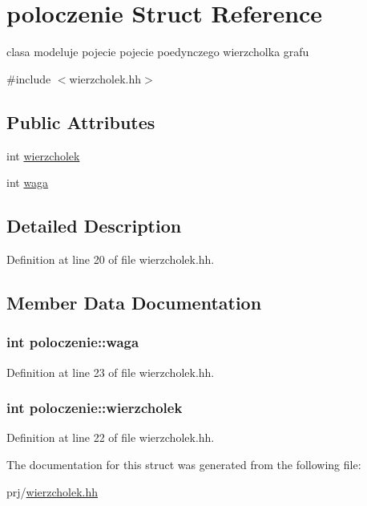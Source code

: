 \hypertarget{structpoloczenie}{\section{poloczenie \-Struct \-Reference}
\label{structpoloczenie}
}


clasa modeluje pojecie pojecie poedynczego wierzcholka grafu  




{\ttfamily \#include $<$wierzcholek.\-hh$>$}

\subsection*{\-Public \-Attributes}
\begin{DoxyCompactItemize}
\item 
int \hyperlink{structpoloczenie_a2386dd47a396eec04be21bbdc722f870}{wierzcholek}
\item 
int \hyperlink{structpoloczenie_a23302e095b791149b562eaf65fa78383}{waga}
\end{DoxyCompactItemize}


\subsection{\-Detailed \-Description}


\-Definition at line 20 of file wierzcholek.\-hh.



\subsection{\-Member \-Data \-Documentation}
\hypertarget{structpoloczenie_a23302e095b791149b562eaf65fa78383}{
\subsubsection[{waga}]{\setlength{\rightskip}{0pt plus 5cm}int {\bf poloczenie\-::waga}}}\label{structpoloczenie_a23302e095b791149b562eaf65fa78383}


\-Definition at line 23 of file wierzcholek.\-hh.

\hypertarget{structpoloczenie_a2386dd47a396eec04be21bbdc722f870}{
\subsubsection[{wierzcholek}]{\setlength{\rightskip}{0pt plus 5cm}int {\bf poloczenie\-::wierzcholek}}}\label{structpoloczenie_a2386dd47a396eec04be21bbdc722f870}


\-Definition at line 22 of file wierzcholek.\-hh.



\-The documentation for this struct was generated from the following file\-:\begin{DoxyCompactItemize}
\item 
prj/\hyperlink{wierzcholek_8hh}{wierzcholek.\-hh}\end{DoxyCompactItemize}
